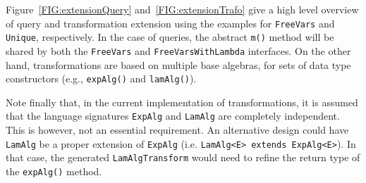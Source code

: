 Figure~\ref{FIG:extensionQuery} and~\ref{FIG:extensionTrafo} give a high level overview of query and transformation extension using the examples for \lstinline{FreeVars} and \lstinline{Unique}, respectively.
In the case of queries, the abstract \lstinline{m()} method will be shared by both the \lstinline{FreeVars} and \lstinline{FreeVarsWithLambda} interfaces.
On the other hand, transformations are based on multiple base algebras, for sets of data type constructors (e.g., \lstinline{expAlg()} and \lstinline{lamAlg()}).

Note finally that, in the current implementation of \name transformations, it is assumed that the language signatures \lstinline{ExpAlg} and \lstinline{LamAlg} are completely independent.
This is however, not an essential requirement.
An alternative design could have \lstinline{LamAlg} be a proper extension of \lstinline{ExpAlg} (i.e. \lstinline{LamAlg<E> extends ExpAlg<E>}).
In that case, the generated \lstinline{LamAlgTransform} would need to refine the return type of the \lstinline{expAlg()} method.


